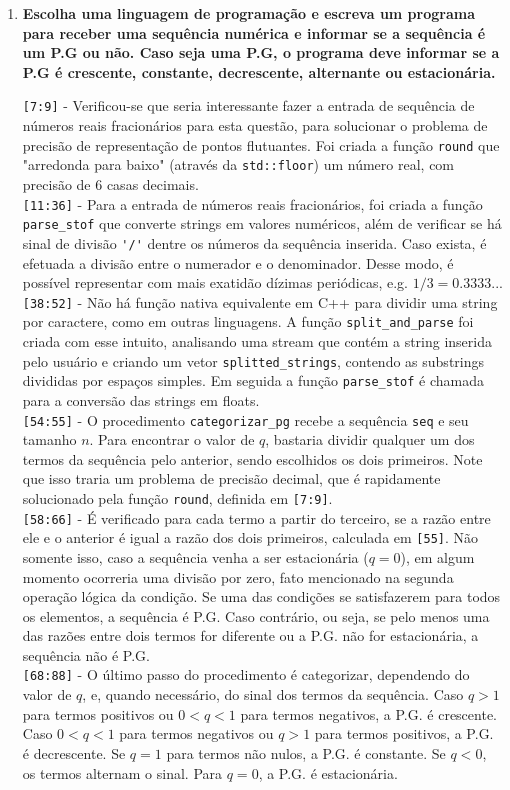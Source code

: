 \begin{enumerate}
	\item \textbf{Escolha uma linguagem de programação e escreva um programa para receber uma sequência numérica e informar se a sequência é um P.G ou não. Caso seja uma P.G, o programa deve informar se a P.G é crescente, constante, decrescente, alternante ou estacionária.}
	
	\verb|[7:9]| - Verificou-se que seria interessante fazer a entrada de sequência de números reais fracionários para esta questão, para solucionar o problema de precisão de representação de pontos flutuantes. Foi criada a função \verb|round| que "arredonda para baixo" (através da \verb|std::floor|) um número real, com precisão de 6 casas decimais.\\
	\verb|[11:36]| - Para a entrada de números reais fracionários, foi criada a função \verb|parse_stof| que converte strings em valores numéricos, além de verificar se há sinal de divisão \verb|'/'| dentre os números da sequência inserida. Caso exista, é efetuada a divisão entre o numerador e o denominador. Desse modo, é possível representar com mais exatidão dízimas periódicas, e.g. $1/3 = 0.3333...$\\
	\verb|[38:52]| - Não há função nativa equivalente em C++ para dividir uma string por caractere, como em outras linguagens. A função \verb|split_and_parse| foi criada com esse intuito, analisando uma stream que contém a string inserida pelo usuário e criando um vetor \verb|splitted_strings|, contendo as substrings divididas por espaços simples. Em seguida a função \verb|parse_stof| é chamada para a conversão das strings em floats.\\
	\verb|[54:55]| - O procedimento \verb|categorizar_pg| recebe a sequência \verb|seq| e seu tamanho $n$. Para encontrar o valor de $q$, bastaria dividir qualquer um dos termos da sequência pelo anterior, sendo escolhidos os dois primeiros. Note que isso traria um problema de precisão decimal, que é rapidamente solucionado pela função \verb|round|, definida em \verb|[7:9]|.\\
	\verb|[58:66]| - É verificado para cada termo a partir do terceiro, se a razão entre ele e o anterior é igual a razão dos dois primeiros, calculada em \verb|[55]|. Não somente isso, caso a sequência venha a ser estacionária ($q=0$), em algum momento ocorreria uma divisão por zero, fato mencionado na segunda operação lógica da condição. Se uma das condições se satisfazerem para todos os elementos, a sequência é P.G. Caso contrário, ou seja, se pelo menos uma das razões entre dois termos for diferente ou a P.G. não for estacionária, a sequência não é P.G.\\
	\verb|[68:88]| - O último passo do procedimento é categorizar, dependendo do valor de $q$, e, quando necessário, do sinal dos termos da sequência. Caso $q > 1$ para termos positivos ou $0 < q < 1$ para termos negativos, a P.G. é crescente. Caso $0 < q < 1$ para termos negativos ou $q > 1$ para termos positivos, a P.G. é decrescente. Se $q = 1$ para termos não nulos, a P.G. é constante. Se $q < 0$, os termos alternam o sinal. Para $q = 0$, a P.G. é estacionária.
	

\end{enumerate}

